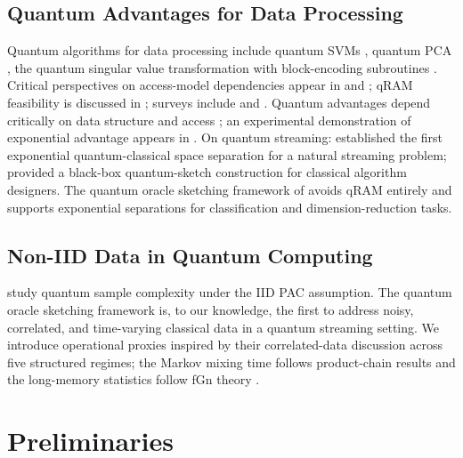 \documentclass[sensors,article,submit,pdftex,moreauthors]{Definitions/mdpi}
\begin{document}
\subsection{Quantum Advantages for Data Processing}

Quantum algorithms for data processing include quantum SVMs \citep{rebentrost2014quantum}, quantum PCA \citep{lloyd2014quantum}, the quantum singular value transformation \citep{gilyen2019qsvt} with block-encoding subroutines \citep{chakraborty2019blockencodings}. Critical perspectives on access-model dependencies appear in \citet{aaronson2015readthefineprint} and \citet{tang2019quantum}; qRAM feasibility is discussed in \citet{giovannetti2008quantum}; surveys include \citet{chen2024qmlsurvey} and \citet{schuld2018supervised}. Quantum advantages depend critically on data structure and access \citep{huang2021powerofdata}; an experimental demonstration of exponential advantage appears in \citet{huang2022experiments}. On quantum streaming: \citet{kallaugher2021streaming} established the first exponential quantum-classical space separation for a natural streaming problem; \citet{kallaugher2025designquantum} provided a black-box quantum-sketch construction for classical algorithm designers. The quantum oracle sketching framework of \citet{zhao2026exponential} avoids qRAM entirely and supports exponential separations for classification and dimension-reduction tasks.

\subsection{Non-IID Data in Quantum Computing}

\citet{arunachalam2018optimal} study quantum sample complexity under the IID PAC assumption. The quantum oracle sketching framework \citep{zhao2026exponential} is, to our knowledge, the first to address noisy, correlated, and time-varying classical data in a quantum streaming setting. We introduce operational proxies inspired by their correlated-data discussion across five structured regimes; the Markov mixing time follows product-chain results \citep{levin2017mixing} and the long-memory statistics follow fGn theory \citep{mandelbrot1968fbm, beran1994statistics}.


\section{Preliminaries}
\label{sec:prelim}
\end{document}
